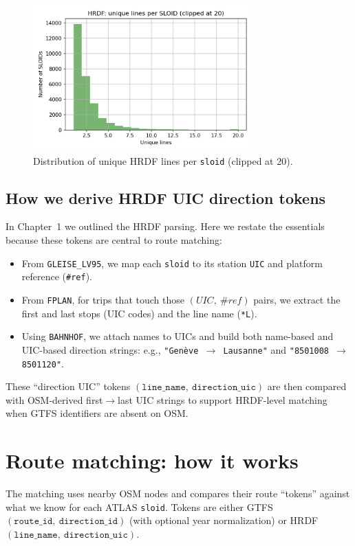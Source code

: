 \begin{figure}[H]
  \centering
  \includegraphics[width=0.75\textwidth]{../figures/chap4/hist_hrdf_lines_per_sloid.png}
  \caption{Distribution of unique HRDF lines per \texttt{sloid} (clipped at 20).}
\end{figure}

\subsection*{How we derive HRDF UIC direction tokens}
In Chapter~1 we outlined the HRDF parsing. Here we restate the essentials because these tokens are central to route matching:
\begin{itemize}
  \item From \texttt{GLEISE\_LV95}, we map each \texttt{sloid} to its station \texttt{UIC} and platform reference (\texttt{\#ref}).
  \item From \texttt{FPLAN}, for trips that touch those \((UIC,\ \#ref)\) pairs, we extract the first and last stops (UIC codes) and the line name (\texttt{*L}).
  \item Using \texttt{BAHNHOF}, we attach names to UICs and build both name-based and UIC-based direction strings: e.g., \texttt{"Genève $\rightarrow$ Lausanne"} and \texttt{"8501008 $\rightarrow$ 8501120"}.
\end{itemize}
These ``direction UIC'' tokens \((\texttt{line\_name},\ \texttt{direction\_uic})\) are then compared with OSM-derived first$\rightarrow$last UIC strings to support HRDF-level matching when GTFS identifiers are absent on OSM.

\section{Route matching: how it works}
The matching uses nearby OSM nodes and compares their route ``tokens'' against what we know for each ATLAS \texttt{sloid}. Tokens are either GTFS \((\texttt{route\_id},\ \texttt{direction\_id})\) (with optional year normalization) or HRDF \((\texttt{line\_name},\ \texttt{direction\_uic})\).

